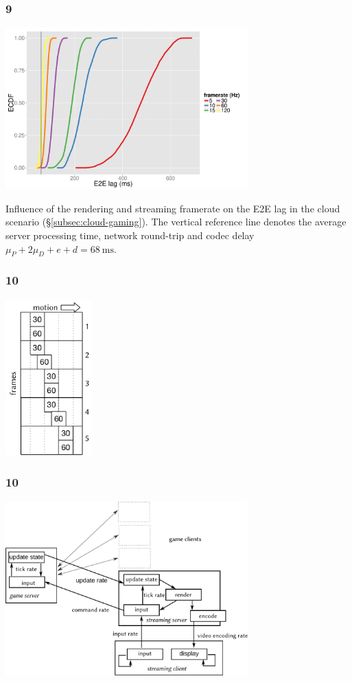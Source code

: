 \documentclass{UDEbeamerEN}
\begin{document}
\begin{frame}
	\frametitle{9}

	\begin{center}
		\includegraphics[width=0.7\textwidth]{../../../simulation/visualization/cloudgaming-lag-cdf.pdf}

		Influence of the rendering and streaming framerate on the \gls{E2E} lag in the cloud scenario (§\ref{subsec:cloud-gaming}). The vertical reference line denotes the average server processing time, network round-trip and codec delay $\mu_P+2\mu_D+e+d=\SI{68}{\milli\second}$.
	\end{center}
\end{frame}

\begin{frame}
	\frametitle{10}

	\begin{center}
		\includegraphics[width=0.25\textwidth]{../../../models/framerate-poster.pdf}
	\end{center}
\end{frame}


\begin{frame}
	\frametitle{10}

	\begin{center}
		\includegraphics[width=0.7\textwidth]{../../../models/game-tick-rate-streamed.pdf}
	\end{center}
\end{frame}
\end{document}
